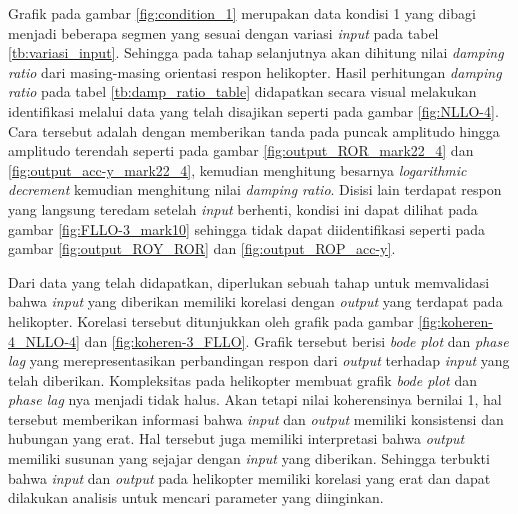 \begin{table}[]
	\caption{Keterangan pengukuran pada grafik}
	\label{tb:penyajian_data}
\end{table}

Grafik pada gambar \ref{fig:condition_1} merupakan data kondisi 1 yang dibagi menjadi beberapa segmen yang sesuai dengan variasi \textit{input} pada tabel \ref{tb:variasi_input}. Sehingga pada tahap selanjutnya akan dihitung nilai \textit{damping ratio} dari masing-masing orientasi respon helikopter. Hasil perhitungan \textit{damping ratio} pada tabel \ref{tb:damp_ratio_table} didapatkan secara visual melakukan identifikasi melalui data yang telah disajikan seperti pada gambar \ref{fig:NLLO-4}. Cara tersebut adalah dengan memberikan tanda pada puncak amplitudo hingga amplitudo terendah seperti pada gambar \ref{fig:output_ROR_mark22_4} dan \ref{fig:output_acc-y_mark22_4}, kemudian menghitung besarnya \textit{logarithmic decrement} kemudian menghitung nilai \textit{damping ratio}. Disisi lain terdapat respon yang langsung teredam setelah \textit{input} berhenti, kondisi ini dapat dilihat pada gambar \ref{fig:FLLO-3_mark10} sehingga tidak dapat diidentifikasi seperti pada gambar \ref{fig:output_ROY_ROR} dan \ref{fig:output_ROP_acc-y}.

Dari data yang telah didapatkan, diperlukan sebuah tahap untuk memvalidasi bahwa \textit{input} yang diberikan memiliki korelasi dengan \textit{output} yang terdapat pada helikopter. Korelasi tersebut ditunjukkan oleh grafik pada gambar \ref{fig:koheren-4_NLLO-4} dan \ref{fig:koheren-3_FLLO}. Grafik tersebut berisi \textit{bode plot} dan \textit{phase lag} yang merepresentasikan perbandingan respon dari \textit{output} terhadap \textit{input} yang telah diberikan. Kompleksitas pada helikopter membuat grafik \textit{bode plot} dan \textit{phase lag} nya menjadi tidak halus. Akan tetapi nilai koherensinya bernilai 1, hal tersebut memberikan informasi bahwa \textit{input} dan \textit{output} memiliki konsistensi dan hubungan yang erat. Hal tersebut juga memiliki interpretasi bahwa \textit{output} memiliki susunan yang sejajar dengan \textit{input} yang diberikan. Sehingga terbukti bahwa \textit{input} dan \textit{output} pada helikopter memiliki korelasi yang erat dan dapat dilakukan analisis untuk mencari parameter yang diinginkan.

